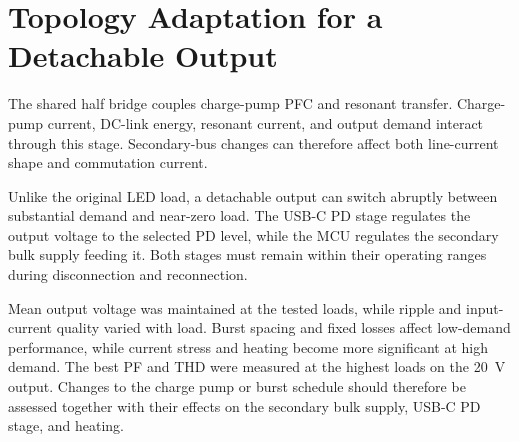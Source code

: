 \section{Topology Adaptation for a Detachable Output}
\label{sec:disc-adaptation}

The shared half bridge couples charge-pump PFC and resonant transfer.
Charge-pump current, DC-link energy, resonant current, and output demand
interact through this stage. Secondary-bus changes can therefore affect
both line-current shape and commutation current.

Unlike the original LED load, a detachable output can switch abruptly
between substantial demand and near-zero load. The USB-C PD stage
regulates the output voltage to the selected PD level, while the MCU
regulates the secondary bulk supply feeding it. Both stages must remain within their operating
ranges during disconnection and reconnection.

Mean output voltage was maintained at the tested loads, while ripple and
input-current quality varied with load. Burst spacing and fixed losses affect
low-demand performance, while current stress and heating become more significant
at high demand. The best PF and THD were measured at the highest loads on the
\SI{20}{\volt} output. Changes to the charge pump or burst schedule should
therefore be assessed together with their effects on the secondary bulk supply, USB-C PD stage, and heating.
